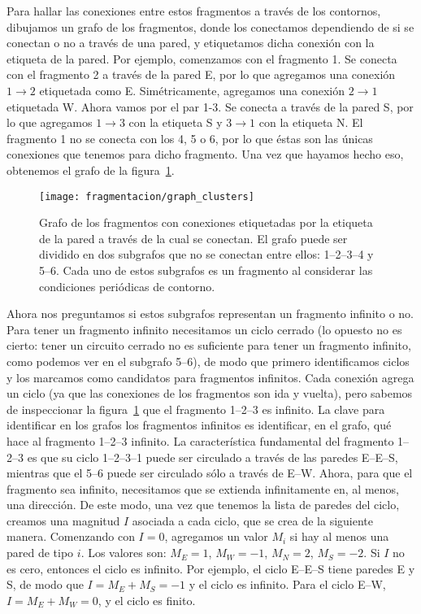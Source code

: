 Para hallar las conexiones entre estos fragmentos a través de los contornos, dibujamos un grafo de los fragmentos, donde los conectamos dependiendo de si se conectan o no a través de una pared, y etiquetamos dicha conexión con la etiqueta de la pared.
Por ejemplo, comenzamos con el fragmento 1.
Se conecta con el fragmento 2 a través de la pared E, por lo que agregamos una conexión $1\rightarrow2$ etiquetada como E.
Simétricamente, agregamos una conexión $2\rightarrow1$ etiquetada W.
Ahora vamos por el par 1-3.
Se conecta a través de la pared S, por lo que agregamos $1\rightarrow3$ con la etiqueta S y $3\rightarrow1$ con la etiqueta N.
El fragmento 1 no se conecta con los 4, 5 o 6, por lo que éstas son las únicas conexiones que tenemos para dicho fragmento.
Una vez que hayamos hecho eso, obtenemos el grafo de la figura~\ref{fig:graph_clusters}.

\begin{figure}  \centering
  \texttt{[image: fragmentacion/graph\_clusters]}
  \caption{Grafo de los fragmentos con conexiones etiquetadas por la etiqueta de la pared a través de la cual se conectan.
    El grafo puede ser dividido en dos subgrafos que no se conectan entre ellos: 1--2--3--4 y 5--6.
    Cada uno de estos subgrafos es un fragmento al considerar las condiciones periódicas de contorno.}
\label{fig:graph_clusters}
\end{figure}

Ahora nos preguntamos si estos subgrafos representan un fragmento infinito o no.
Para tener un fragmento infinito necesitamos un ciclo cerrado (lo opuesto no es cierto: tener un circuito cerrado no es suficiente para tener un fragmento infinito, como podemos ver en el subgrafo 5--6), de modo que primero identificamos ciclos y los marcamos como candidatos para fragmentos infinitos.
Cada conexión agrega un ciclo (ya que las conexiones de los fragmentos son ida y vuelta), pero sabemos de inspeccionar la figura~\ref{fig:graph_clusters} que el fragmento 1--2--3 es infinito.
La clave para identificar en los grafos los fragmentos infinitos es identificar, en el grafo, qué hace al fragmento 1--2--3 infinito.
La característica fundamental del fragmento 1--2--3 es que su ciclo 1--2--3--1 puede ser circulado a través de las paredes E--E--S, mientras que el 5--6 puede ser circulado sólo a través de E--W.
Ahora, para que el fragmento sea infinito, necesitamos que se extienda infinitamente en, al menos, una dirección.
De este modo, una vez que tenemos la lista de paredes del ciclo, creamos una magnitud $I$ asociada a cada ciclo, que se crea de la siguiente manera.
Comenzando con $I=0$, agregamos un valor $M_i$ si hay al menos una pared de tipo $i$.
Los valores son: $M_E= 1$, $M_W = -1$, $M_N = 2$, $M_S = -2$.
Si $I$ no es cero, entonces el ciclo es infinito.
Por ejemplo, el ciclo  E--E--S tiene paredes E y S, de modo que $I = M_E + M_S = -1$ y el ciclo es infinito.
Para el ciclo E--W, $I = M_E + M_W = 0$, y el ciclo es finito.

